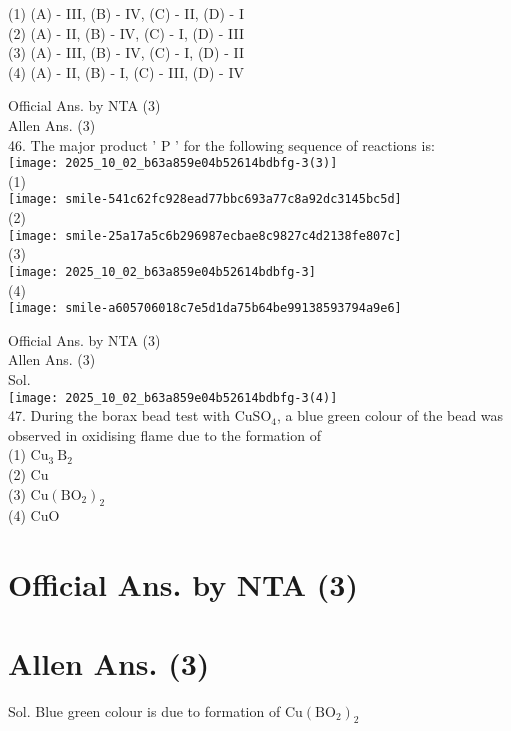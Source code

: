 \documentclass[10pt]{article}
\begin{document}
(1) (A) - III, (B) - IV, (C) - II, (D) - I\\
(2) (A) - II, (B) - IV, (C) - I, (D) - III\\
(3) (A) - III, (B) - IV, (C) - I, (D) - II\\
(4) (A) - II, (B) - I, (C) - III, (D) - IV

Official Ans. by NTA (3)\\
Allen Ans. (3)\\
46. The major product ' P ' for the following sequence of reactions is:\\
\texttt{[image: 2025\_10\_02\_b63a859e04b52614bdbfg-3(3)]}\\
(1)\\
\texttt{[image: smile-541c62fc928ead77bbc693a77c8a92dc3145bc5d]}\\
(2)\\
\texttt{[image: smile-25a17a5c6b296987ecbae8c9827c4d2138fe807c]}\\
(3)\\
\texttt{[image: 2025\_10\_02\_b63a859e04b52614bdbfg-3]}\\
(4)\\
\texttt{[image: smile-a605706018c7e5d1da75b64be99138593794a9e6]}

Official Ans. by NTA (3)\\
Allen Ans. (3)\\
Sol.\\
\texttt{[image: 2025\_10\_02\_b63a859e04b52614bdbfg-3(4)]}\\
47. During the borax bead test with \(\mathrm{CuSO}_{4}\), a blue green colour of the bead was observed in oxidising flame due to the formation of\\
(1) \(\mathrm{Cu}_{3} \mathrm{~B}_{2}\)\\
(2) Cu\\
(3) \(\mathrm{Cu}\left(\mathrm{BO}_{2}\right)_{2}\)\\
(4) CuO

\section*{Official Ans. by NTA (3)}
\section*{Allen Ans. (3)}
Sol. Blue green colour is due to formation of \(\mathrm{Cu}\left(\mathrm{BO}_{2}\right)_{2}\)
\end{document}
